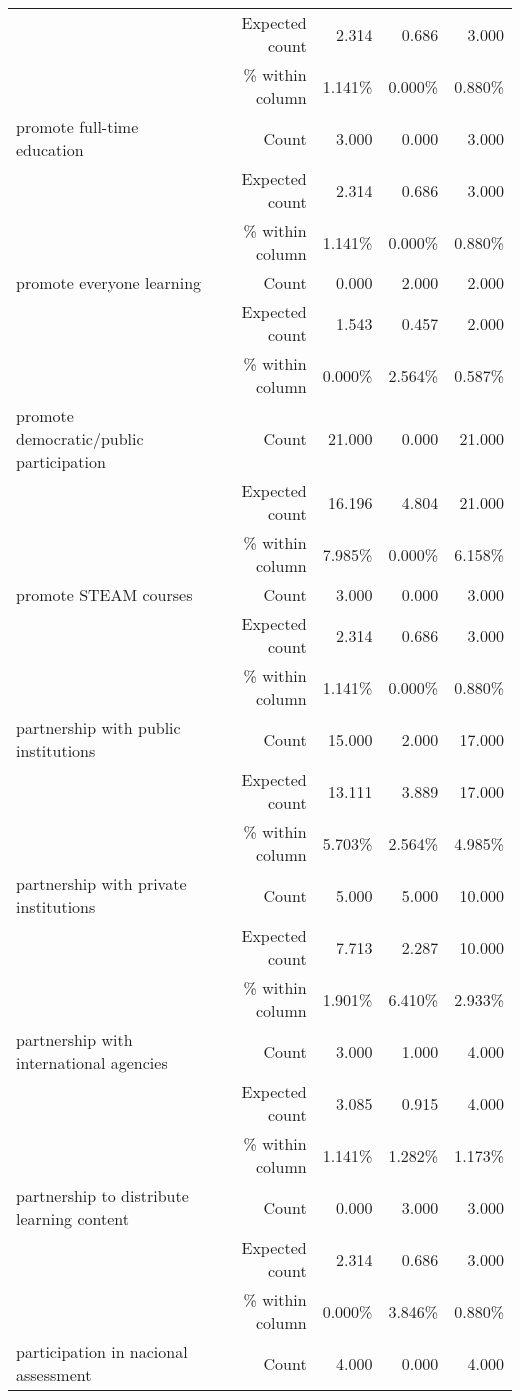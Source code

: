 \documentclass[6pt, oneside]{article}   	%
\begin{document}
\begin{table}[h]
{\begin{tabular}{lrrrr}
			 & Expected count & 2.314 & 0.686 & 3.000  \\
			 &  \% within column & 1.141\% & 0.000\% & 0.880\%  \\
			promote full-time education & Count & 3.000 & 0.000 & 3.000  \\
			 & Expected count & 2.314 & 0.686 & 3.000  \\
			 &  \% within column & 1.141\% & 0.000\% & 0.880\%  \\
			promote everyone learning & Count & 0.000 & 2.000 & 2.000  \\
			 & Expected count & 1.543 & 0.457 & 2.000  \\
			 &  \% within column & 0.000\% & 2.564\% & 0.587\%  \\
			promote democratic/public participation & Count & 21.000 & 0.000 & 21.000  \\
			 & Expected count & 16.196 & 4.804 & 21.000  \\
			 &  \% within column & 7.985\% & 0.000\% & 6.158\%  \\
			promote STEAM courses & Count & 3.000 & 0.000 & 3.000  \\
			 & Expected count & 2.314 & 0.686 & 3.000  \\
			 &  \% within column & 1.141\% & 0.000\% & 0.880\%  \\
			partnership with public institutions & Count & 15.000 & 2.000 & 17.000  \\
			 & Expected count & 13.111 & 3.889 & 17.000  \\
			 &  \% within column & 5.703\% & 2.564\% & 4.985\%  \\
			partnership with private institutions & Count & 5.000 & 5.000 & 10.000  \\
			 & Expected count & 7.713 & 2.287 & 10.000  \\
			 &  \% within column & 1.901\% & 6.410\% & 2.933\%  \\
			partnership with international agencies & Count & 3.000 & 1.000 & 4.000  \\
			 & Expected count & 3.085 & 0.915 & 4.000  \\
			 &  \% within column & 1.141\% & 1.282\% & 1.173\%  \\
			partnership to distribute learning content & Count & 0.000 & 3.000 & 3.000  \\
			 & Expected count & 2.314 & 0.686 & 3.000  \\
			 &  \% within column & 0.000\% & 3.846\% & 0.880\%  \\
			participation in nacional assessment & Count & 4.000 & 0.000 & 4.000  \\

\end{tabular}}
\end{table}
\end{document}
